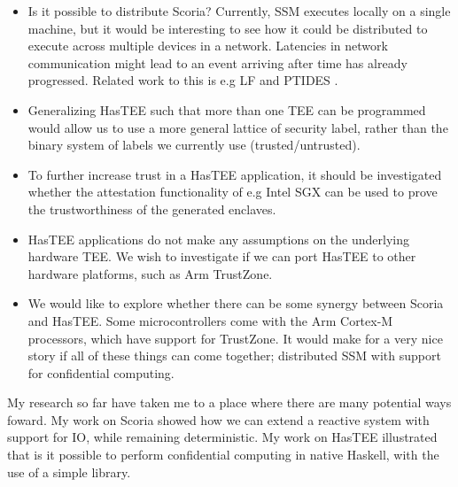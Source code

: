\begin{itemize}
    \item Is it possible to distribute Scoria? Currently, SSM executes locally on a single machine, but it would be interesting
    to see how it could be distributed to execute across multiple devices in a network. Latencies in network communication
    might lead to an event arriving after time has already progressed. Related work to this is e.g LF \cite{DBLP:journals/tecs/LohstrohMBL21} and PTIDES \cite{DBLP:conf/dsrt/DerlerLM08}.
    \item Generalizing HasTEE such that more than one TEE can be programmed would allow
    us to use a more general lattice of security label, rather than the binary system of labels we currently use (trusted/untrusted).
    \item To further increase trust in a HasTEE application, it should be investigated whether the attestation functionality of
    e.g Intel SGX can be used to prove the trustworthiness of the generated enclaves.
    \item HasTEE applications do not make any assumptions on the underlying hardware TEE. We wish to investigate if we can port
    HasTEE to other hardware platforms, such as Arm TrustZone.
    \item We would like to explore whether there can be some synergy between Scoria and HasTEE. Some microcontrollers come with
    the Arm Cortex-M processors, which have support for TrustZone. It would make for a very nice story if all of these things can come
    together; distributed SSM with support for confidential computing.
\end{itemize}



My research so far have taken me to a place where there are many potential ways foward. My work on Scoria showed how we can
extend a reactive system with support for IO, while remaining deterministic. My work on HasTEE illustrated that is it possible
to perform confidential computing in native Haskell, with the use of a simple library.





